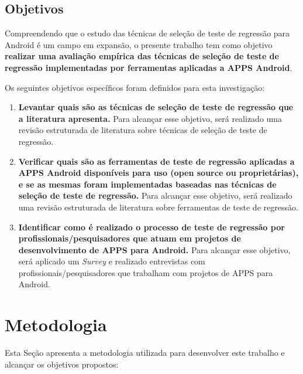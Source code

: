 \subsection{Objetivos}

Compreendendo que o estudo das técnicas de seleção de teste de regressão para Android é um campo em expansão, o presente trabalho tem como objetivo \textbf{realizar uma avaliação empírica das técnicas de seleção de teste de regressão implementadas por ferramentas aplicadas a \ac{APPS} Android}.

Os seguintes objetivos específicos foram definidos para esta investigação:

\begin{enumerate}[label=\bf O\arabic*,leftmargin=1.5cm]

    \item \textbf{Levantar quais são as técnicas de seleção de teste de regressão que a literatura apresenta.} Para alcançar esse objetivo, será realizado uma revisão estruturada de literatura sobre técnicas de seleção de teste de regressão.
    
    \item \textbf{Verificar quais são as ferramentas de teste de regressão aplicadas a \ac{APPS} Android disponíveis para uso (open source ou proprietárias), e se as mesmas foram implementadas baseadas nas técnicas de seleção de teste de regressão.} Para alcançar esse objetivo, será realizado uma revisão estruturada de literatura sobre ferramentas de teste de regressão.
    
    \item \textbf{Identificar como é realizado o processo de teste de regressão por profissionais/pesquisadores que atuam em projetos de desenvolvimento de \ac{APPS} para Android.} Para alcançar esse objetivo, será aplicado um \textit{Survey} e realizado entrevistas com profissionais/pesquisadores que trabalham com projetos de \ac{APPS} para Android.

\end{enumerate}

\section{Metodologia}\label{sec:metodologia}

Esta Seção apresenta a metodologia utilizada para desenvolver este trabalho e alcançar os objetivos propostos:

